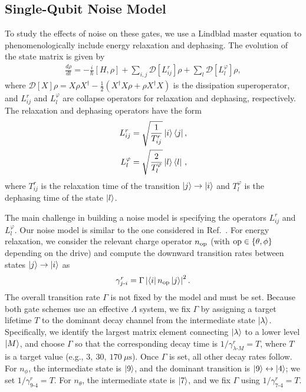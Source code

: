 \subsection{Single-Qubit Noise Model}\label{zp:sec:noise_1q}
To study the effects of noise on these gates, we use a Lindblad master equation to phenomenologically include energy relaxation and dephasing.
The evolution of the state matrix is given by
\begin{align} \label{zp:eq:master_eq}
\frac{d\rho}{dt} = -\frac{i}{\hbar}[H, \rho] + \sum_{i,j} \mathcal{D}[L^r_{ij}]\rho + \sum_l \mathcal{D}[L^\varphi_l]\rho,
\end{align}
where $\mathcal{D}[X]\rho = X \rho X^\dagger - \frac{1}{2}( X^\dagger X \rho + \rho X^\dagger X)$ is the dissipation superoperator, and $L^r_{ij}$ and $L^\varphi_l$ are collapse operators for relaxation and dephasing, respectively.
The relaxation and dephasing operators have the form
\begin{subequations}\label{zp:eq:lindblad_ops}
 \begin{align}
 L^r_{ij} = \sqrt{\frac{1}{T^r_{ij}}}  \ket{i} \bra{j}  ,\\
L^\varphi_l = \sqrt{\frac{2}{T^\varphi_l}}  \ket{l} \bra{l} \, ,
\end{align}
\end{subequations}
where $T_{ij}^r$ is the relaxation time of the transition $\ket{j} \rightarrow\ket {i}$ and $T^\varphi_l$ is the dephasing time of the state $\ket{l}$.

The main challenge in building a noise model is specifying the operators $L^r_{ij}$ and $L^\varphi_l$.
Our noise model is similar to the one considered in Ref.~\cite{abdelhafez2020universal}.
For energy relaxation, we consider the relevant charge operator $n_{\rm op}$ (with ${\rm op}\in\{\theta,\phi\}$ depending on the drive) and compute the downward transition rates between states $\ket{j} \rightarrow \ket{i}$ as
\begin{align} \label{zp:eq:zp_t1}
\gamma_{j \text{-} i}^r = \Gamma \left| \bra{i} n_{\rm op} \ket{j} \right|^2.
\end{align}
The overall transition rate $\Gamma$ is not fixed by the model and must be set.
Because both gate schemes use an effective $\Lambda$ system, we fix $\Gamma$ by assigning a target lifetime $T$ to the dominant decay channel from the intermediate state $\ket{\lambda}$.
Specifically, we identify the largest matrix element connecting $\ket{\lambda}$ to a lower level $\ket{M}$, and choose $\Gamma$ so that the corresponding decay time is $1/\gamma^r_{\lambda \text{-} M} = T$, where $T$ is a target value (e.g., $3,\ 30,\ 170~\mu\mathrm{s}$).
Once $\Gamma$ is set, all other decay rates follow.
For $n_\phi$, the intermediate state is $\ket{9}$, and the dominant transition is $\ket{9} \leftrightarrow \ket{4}$; we set $1/\gamma^r_{9 \text{-} 4} = T$.
For $n_\theta$, the intermediate state is $\ket{7}$, and we fix $\Gamma$ using $1/\gamma^r_{7 \text{-} 4} = T$.

